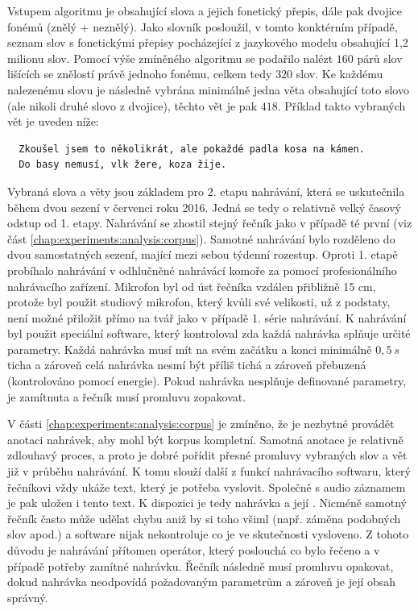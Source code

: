 Vstupem algoritmu je  obsahující slova a jejich fonetický přepis, dále pak dvojice fonémů (znělý + neznělý). Jako slovník posloužil, v tomto konktérním případě, seznam slov s fonetickými přepisy pocházející z jazykového modelu obsahující 1,2 milionu slov. Pomocí výše zmíněného algoritmu se podařilo nalézt $160$ párů slov lišících se znělostí právě jednoho fonému, celkem tedy $320$ slov. Ke každému nalezenému slovu je následně vybrána minimálně jedna věta obsahující toto slovo (ale nikoli druhé slovo z dvojice), těchto vět je pak $418$. Příklad takto vybraných vět je uveden níže:

\begin{verbatim}
  Zkoušel jsem to několikrát, ale pokaždé padla kosa na kámen.
  Do basy nemusí, vlk žere, koza žije.
\end{verbatim}

Vybraná slova a věty jsou základem pro 2. etapu nahrávání, která se uskutečnila během dvou sezení v červenci roku 2016. Jedná se tedy o relativně velký časový odstup od 1. etapy. Nahrávání se zhostil stejný řečník jako v případě té první (viz část \ref{chap:experiments:analysis:corpus}). Samotné nahrávání bylo rozděleno do dvou samostatných sezení, mající mezi sebou týdenní rozestup. Oproti 1. etapě probíhalo nahrávání v odhlučněné nahrávácí komoře za pomocí profesionálního nahrávacího zařízení. Mikrofon byl od úst řečníka vzdálen přibližně 15 cm, protože byl použit studiový mikrofon, který kvůli své velikosti, už z podstaty, není možné přiložit přímo na tvář jako v případě 1. série nahrávání. K nahrávání byl použit speciální software, který kontroloval zda každá nahrávka splňuje určité parametry. Každá nahrávka musí mít na svém začátku a konci minimálně $0,5\ s$ ticha a zároveň celá nahrávka nesmí být příliš tichá a zároveň přebuzená (kontrolováno pomocí energie). Pokud nahrávka nesplňuje definované parametry, je zamítnuta a řečník musí promluvu zopakovat.

V části \ref{chap:experiments:analysis:corpus} je zmíněno, že je nezbytné provádět anotaci nahrávek, aby mohl být korpus kompletní. Samotná anotace je  relativně zdlouhavý proces, a proto je dobré pořídit přesné promluvy vybraných slov a vět již v průběhu nahrávání. K tomu slouží další z funkcí nahrávacího softwaru, který řečníkovi vždy ukáže text, který je potřeba vyslovit. Společně s audio záznamem je pak uložen i tento text. K dispozici je tedy nahrávka a její . Nicméně samotný řečník často může udělat chybu aniž by si toho všiml (např. záměna podobných slov apod.) a software nijak nekontroluje co je ve skutečnosti vysloveno. Z tohoto důvodu je nahrávání přítomen operátor, který poslouchá co bylo řečeno a v případě potřeby zamítné nahrávku. Řečník následně musí promluvu opakovat, dokud nahrávka neodpovídá požadovaným parametrům a zároveň je její obsah správný.

